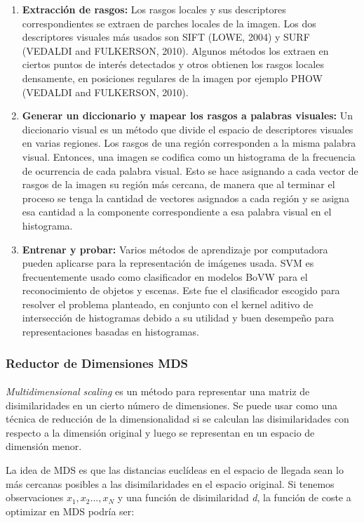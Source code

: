 \documentclass{article}
\begin{document}
\begin{enumerate}
	\item \textbf{Extracción de rasgos:} Los rasgos locales y sus descriptores correspondientes se extraen de parches locales de la imagen. Los dos descriptores visuales más usados son SIFT (LOWE, 2004) y SURF (VEDALDI and FULKERSON, 2010). Algunos métodos los extraen en ciertos puntos de interés detectados y otros obtienen los rasgos locales densamente, en posiciones regulares de la imagen por ejemplo PHOW (VEDALDI  and  FULKERSON,  2010).
	\item \textbf{Generar un diccionario y mapear los rasgos a palabras visuales:} Un diccionario visual es un método que divide el espacio de descriptores visuales en varias regiones. Los rasgos de una región corresponden a la misma palabra visual. Entonces, una imagen se codifica como un histograma de la frecuencia de ocurrencia de cada palabra visual. Esto se hace asignando a cada vector de rasgos de la imagen su región más cercana, de manera que al terminar el proceso se tenga la cantidad de vectores asignados a cada región y se asigna esa cantidad a la componente correspondiente a esa palabra visual en el histograma.
	\item \textbf{Entrenar y probar:} Varios métodos de aprendizaje por computadora pueden aplicarse para la representación de imágenes usada. SVM es frecuentemente usado como clasificador en modelos BoVW para el reconocimiento de objetos y escenas. Este fue el clasificador escogido para resolver el problema planteado, en conjunto con el kernel aditivo de intersección de histogramas debido a su utilidad y buen desempeño para representaciones basadas en histogramas.
\end{enumerate}

\subsubsection{Reductor de Dimensiones MDS}
\paragraph{}

\textit{Multidimensional scaling} es un método para representar una matriz de disimilaridades en un cierto número de dimensiones. Se puede usar como una técnica de reducción de la dimensionalidad si se calculan las disimilaridades con respecto a la dimensión original y luego se representan en un espacio de dimensión menor.

La idea de MDS es que las distancias euclídeas en el espacio de llegada sean lo más cercanas posibles a las disimilaridades en el espacio original. Si tenemos observaciones $x_1, x_2..., x_N$ y una función de disimilaridad \textit{d}, la función de coste a optimizar en MDS podría ser:
\end{document}
